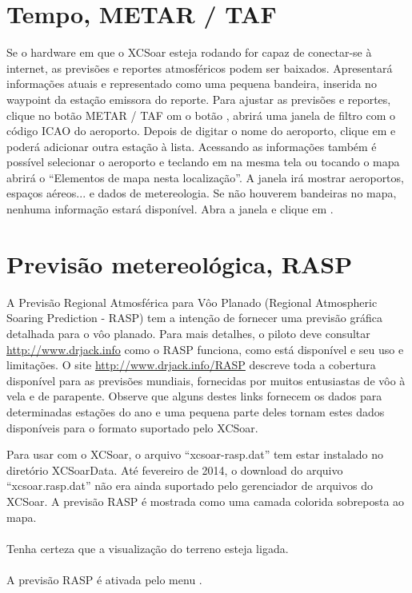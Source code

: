 \section{Tempo, METAR / TAF}\label{sec:metar-taf}

Se o hardware em que o XCSoar esteja rodando for capaz de conectar-se à internet, as previsões e reportes atmosféricos podem ser baixados.    Apresentará informações atuais e representado como uma pequena bandeira, inserida no waypoint da estação emissora do reporte. 
Para ajustar as previsões e reportes, clique no botão METAR / TAF om o botão
 , abrirá uma janela de filtro com o código ICAO do aeroporto.  Depois de digitar o nome do aeroporto, clique em  e poderá adicionar outra estação à lista.  Acessando as informações também é possível selecionar o aeroporto e teclando em  na mesma tela ou tocando o mapa abrirá o “Elementos de mapa nesta localização”.  A janela irá mostrar aeroportos, espaços aéreos... e dados de metereologia. Se não houverem bandeiras no mapa, nenhuma informação estará disponível.  Abra a janela e clique em .  

\section{Previsão metereológica, RASP}\label{sec:weather-forecast}

A Previsão Regional Atmosférica para Vôo Planado (Regional Atmospheric Soaring Prediction - RASP) tem a intenção de fornecer uma previsão gráfica detalhada para o vôo planado.  Para mais detalhes, o piloto deve consultar  \url{http://www.drjack.info} como o RASP funciona, como está disponível e seu uso e limitações.  
O site \url{http://www.drjack.info/RASP} descreve toda a cobertura disponível para as previsões mundiais, fornecidas por muitos entusiastas de vôo à vela e de parapente.  Observe que alguns destes links fornecem os dados para determinadas estações do ano e uma pequena parte deles tornam estes dados disponíveis para o formato suportado pelo XCSoar.

Para usar com o XCSoar, o arquivo “xcsoar-rasp.dat” tem estar instalado no diretório XCSoarData.  Até fevereiro de 2014, o download do arquivo “xcsoar.rasp.dat” não era ainda suportado pelo gerenciador de arquivos do XCSoar. A previsão RASP é mostrada como uma camada colorida sobreposta ao mapa. \\ \\
Tenha certeza que a visualização do terreno esteja ligada. \tip{} \\ \\
A previsão RASP é ativada pelo menu   
.

